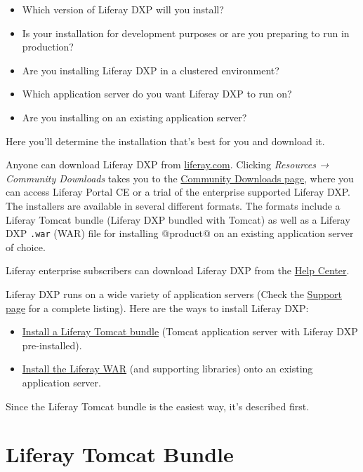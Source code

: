 \begin{itemize}
\tightlist
\item
  Which version of Liferay DXP will you install?
\item
  Is your installation for development purposes or are you preparing to
  run in production?
\item
  Are you installing Liferay DXP in a clustered environment?
\item
  Which application server do you want Liferay DXP to run on?
\item
  Are you installing on an existing application server?
\end{itemize}

Here you'll determine the installation that's best for you and download
it.

Anyone can download Liferay DXP from
\href{https://www.liferay.com}{liferay.com}. Clicking \emph{Resources →
Community Downloads} takes you to the
\href{https://www.liferay.com/downloads-community}{Community Downloads
page}, where you can access Liferay Portal CE or a trial of the
enterprise supported Liferay DXP. The installers are available in
several different formats. The formats include a Liferay Tomcat bundle
(Liferay DXP bundled with Tomcat) as well as a Liferay DXP \texttt{.war}
(WAR) file for installing @product@ on an existing application server of
choice.

Liferay enterprise subscribers can download Liferay DXP from the
\href{https://help.liferay.com/hc}{Help Center}.

Liferay DXP runs on a wide variety of application servers (Check the
\href{https://help.liferay.com/hc/categories/360000894391-Product-Support}{Support
page} for a complete listing). Here are the ways to install Liferay DXP:

\begin{itemize}
\item
  \hyperref[liferay-tomcat-bundle]{Install a Liferay Tomcat bundle}
  (Tomcat application server with Liferay DXP pre-installed).
\item
  \hyperref[downloading-the-liferay-war-and-dependency-jars]{Install the
  Liferay WAR} (and supporting libraries) onto an existing application
  server.
\end{itemize}

Since the Liferay Tomcat bundle is the easiest way, it's described
first.

\section{Liferay Tomcat Bundle}\label{liferay-tomcat-bundle}

